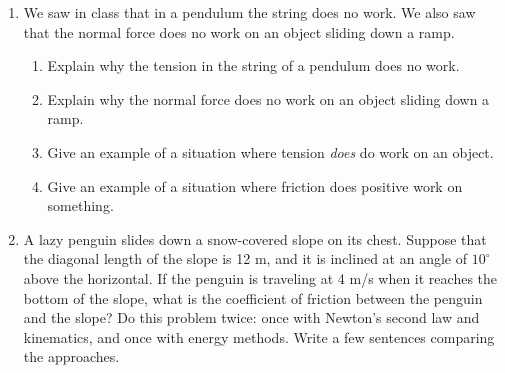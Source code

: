\documentclass[12pt]{article}
\begin{document}
	\Large
	\centerline{}
	\normalsize
	\centerline{}
	


	\begin{enumerate}
		
		\item{We saw in class that in a pendulum the string does no work. We also saw that the normal force does no work on an object sliding down a ramp.}
		\begin{enumerate}
			\item{Explain why the tension in the string of a pendulum does no work.}
			\item{Explain why the normal force does no work on an object sliding down a ramp.}
			\item{Give an example of a situation where tension {\it does} do work on an object.}
			\item{Give an example of a situation where friction does positive work on something.}
		\end{enumerate}


 \item{A lazy penguin slides down a snow-covered slope on its chest. Suppose that the diagonal length of the slope is 12 m, and it is inclined at an angle of $10^\circ$ above the horizontal. If the penguin is traveling at 4 m/s when it 
	reaches the bottom of the slope, what is the coefficient of friction between the penguin and the slope? Do this problem twice: once with Newton's second law and kinematics, and once with energy methods. Write a few sentences comparing the 
	approaches.}


\end{enumerate}
\end{document}
